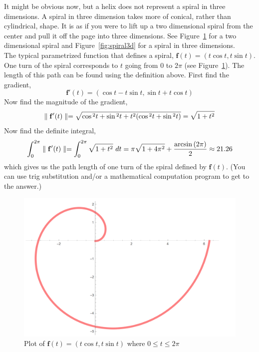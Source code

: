\documentclass[12pt]{article}
\begin{document}
It might be obvious now, but a helix does not represent a spiral in three dimensions. A spiral in three dimension takes more of conical, rather than cylindrical, shape. It is as if you were to lift up a two dimensional spiral from the center and pull it off the page into three dimensions. See Figure~\ref{fig:arclengthexample} for a two dimensional spiral and Figure~\ref{fig:spiral3d} for a spiral in three dimensions. \\

The typical parametrized function that defines a spiral, $\mathbf{f}(t) = (t\cos{t}, t\sin{t})$. One turn of the spiral corresponds to $t$ going from $0$ to $2\pi$ (see Figure~\ref{fig:arclengthexample}). The length of this path can be found using the definition above. First find the gradient,
\[
\mathbf{f}'(t) = (\cos{t}-t\sin{t}, \sin{t}+t\cos{t})
\]
Now find the magnitude of the gradient,
\[
\parallel\mathbf{f}'(t)\parallel = \sqrt{\cos{^2t} + \sin{^2t} + t^2(\cos{^2t} + \sin{^2t})} = \sqrt{1+t^2}
\]
Now find the definite integral,
\[
\int_{0}^{2\pi} \parallel\mathbf{f}'(t)\parallel  = \int_{0}^{2\pi}  \sqrt{1+t^2}\ dt = \pi\sqrt{1+4\pi^2} + \frac{\arcsin{(2\pi)}}{2} \approx 21.26
\]
which gives us the path length of one turn of the spiral defined by $\mathbf{f}(t)$. (You can use trig substitution and/or a mathematical computation program to get to the answer.)

\begin{figure}[h]
\centering
\caption{Plot of $\mathbf{f}(t) = (t\cos{t}, t\sin{t})$ where $0\leq t\leq 2\pi$}
\label{fig:arclengthexample}
\indent\includegraphics[scale=0.4]{arclength_spiral.png}
\end{figure}
\end{document}
